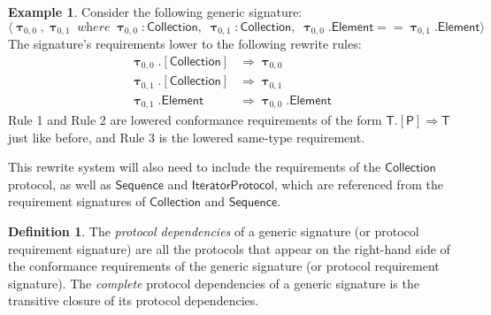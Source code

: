 \documentclass[headsepline,bibliography=totoc]{scrreport}
\newcommand{\namesym}[1]{\mathsf{#1}}
\newcommand{\proto}[1]{\bm{\mathsf{#1}}}
\newcommand{\protosym}[1]{[\proto{#1}]}
\newcommand{\gensig}[2]{\langle #1\;\textit{where}\;#2\rangle}
\newcommand{\genericsym}[2]{\bm{\uptau}_{#1,#2}}
\theoremstyle{definition}
\newtheorem{example}{Example}[chapter]
\theoremstyle{definition}
\newtheorem{definition}{Definition}[chapter]
\theoremstyle{definition}
\begin{document}
\begin{example}
Consider the following generic signature:
\[\gensig{\genericsym{0}{0},\genericsym{0}{1}}{\genericsym{0}{0}\colon\proto{Collection},\;\genericsym{0}{1}\colon\proto{Collection},\;\genericsym{0}{0}.\namesym{Element}==\genericsym{0}{1}.\namesym{Element}}\]
The signature's requirements lower to the following rewrite rules:
\begin{align}
\genericsym{0}{0}.\protosym{Collection}&\Rightarrow\genericsym{0}{0}\tag{1}\\
\genericsym{0}{1}.\protosym{Collection}&\Rightarrow\genericsym{0}{1}\tag{2}\\
\genericsym{0}{1}.\namesym{Element}&\Rightarrow\genericsym{0}{0}.\namesym{Element}\tag{3}
\end{align}
Rule 1 and Rule 2 are lowered conformance requirements of the form $\namesym{T}.\protosym{P}\Rightarrow\namesym{T}$ just like before, and Rule 3 is the lowered same-type requirement.

This rewrite system will also need to include the requirements of the $\proto{Collection}$ protocol, as well as $\proto{Sequence}$ and $\proto{IteratorProtocol}$, which are referenced from the requirement signatures of $\proto{Collection}$ and $\proto{Sequence}$.
\end{example}
\begin{definition}The \emph{protocol dependencies} of a generic signature (or protocol requirement signature) are all the protocols that appear on the right-hand side of the conformance requirements of the generic signature (or protocol requirement signature). The \emph{complete} protocol dependencies of a generic signature is the transitive closure of its protocol dependencies.
\end{definition}
\end{document}
